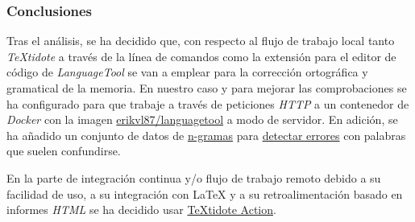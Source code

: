 \subsubsection{Conclusiones}

Tras el análisis, se ha decidido que, con respecto al flujo de trabajo local tanto \textit{TeXtidote} a través de la línea de comandos como la extensión para el editor de código de \textit{LanguageTool} se van a emplear para la corrección ortográfica y gramatical de la memoria. En nuestro caso y para mejorar las comprobaciones se ha configurado para que trabaje a través de peticiones \textit{HTTP} a un contenedor de \textit{Docker} con la imagen \href{https://hub.docker.com/r/erikvl87/languagetool}{erikvl87/languagetool} a modo de servidor. En adición, se ha añadido un conjunto de datos de \href{https://es.wikipedia.org/wiki/N-grama}{n-gramas} para \href{https://dev.languagetool.org/finding-errors-using-n-gram-data}{detectar errores} con palabras que suelen confundirse.

En la parte de integración continua y/o flujo de trabajo remoto debido a su facilidad de uso, a su integración con \LaTeX{} y a su retroalimentación basado en informes \textit{HTML} se ha decidido usar \href{https://github.com/marketplace/actions/textidote-action}{TeXtidote Action}.

